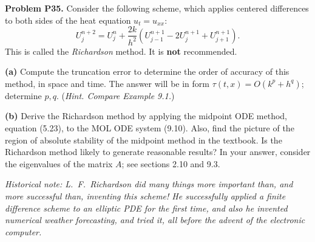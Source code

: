 \documentclass[12pt]{amsart}
\newcommand{\prob}[1]{\bigskip\noindent\textbf{#1}\quad }
\newcommand{\epart}[1]{\medskip\noindent\textbf{(#1)}\quad }
\begin{document}
\prob{Problem P35.}  Consider the following scheme, which applies centered differences to both sides of the heat equation $u_t=u_{xx}$:
    $$U_j^{n+2} = U_j^n + \frac{2k}{h^2}(U_{j-1}^{n+1} - 2U_j^{n+1} +
U_{j+1}^{n+1}).$$
This is called the \emph{Richardson} method.  It is \textbf{not} recommended.

\epart{a} Compute the truncation error to determine the order of accuracy of this method, in space and time.  The answer will be in form $\tau(t,x) = O(k^p + h^q)$; determine $p,q$.  (\emph{Hint. Compare Example 9.1.})

\epart{b} Derive the Richardson method by applying the midpoint ODE method, equation (5.23), to the MOL ODE system (9.10).  Also, find the picture of the region of absolute stability of the midpoint method in the textbook.  Is the Richardson method likely to generate reasonable results?  In your answer, consider the eigenvalues of the matrix $A$; see sections 2.10 and 9.3.

\medskip
\noindent \emph{Historical note: L.~F.~Richardson did many things more important than, and more successful than, inventing this scheme!  He successfully applied a finite difference scheme to an elliptic PDE for the first time, and also he invented numerical weather forecasting, and tried it, all before the advent of the electronic computer.}
\end{document}
